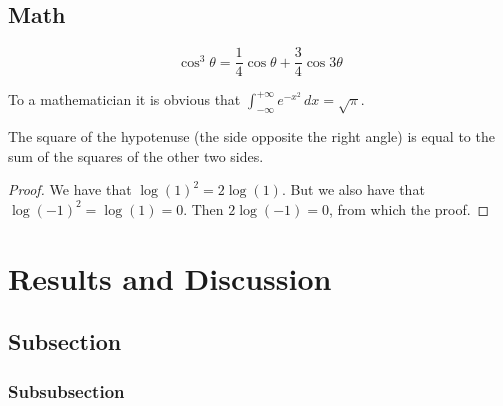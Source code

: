 \documentclass[
10pt, %
a4paper, %
oneside, %
headinclude,footinclude, %
BCOR5mm, %
]{scrartcl}
\begin{document}
\subsection{Math}

\lipsum[4] %

\begin{equation}
\cos^3 \theta =\frac{1}{4}\cos\theta+\frac{3}{4}\cos 3\theta
\label{eq:refname2}
\end{equation}

\lipsum[5] %

\begin{definition}[Gauss] 
To a mathematician it is obvious that
$\int_{-\infty}^{+\infty}
e^{-x^2}\,dx=\sqrt{\pi}$. 
\end{definition} 

\begin{theorem}[Pythagoras]
The square of the hypotenuse (the side opposite the right angle) is equal to the sum of the squares of the other two sides.
\end{theorem}

\begin{proof} 
We have that $\log(1)^2 = 2\log(1)$.
But we also have that $\log(-1)^2=\log(1)=0$.
Then $2\log(-1)=0$, from which the proof.
\end{proof}


\section{Results and Discussion}

\lipsum[10] %


\subsection{Subsection}

\lipsum[11] %

\subsubsection{Subsubsection}

\lipsum[12] %
\end{document}
